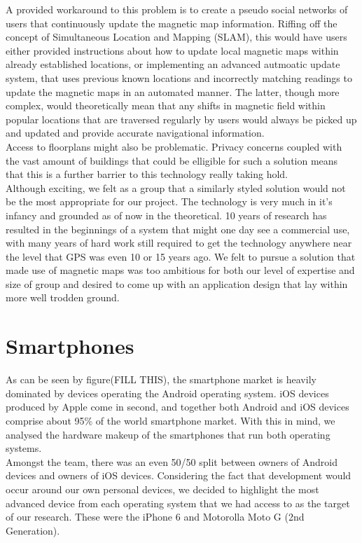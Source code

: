 \documentclass[main.tex]{subfiles}
\begin{document}
 A provided workaround to this problem is to create a pseudo social networks of users that continuously update the magnetic map information. Riffing off the concept of Simultaneous Location and Mapping (SLAM), this would have users either provided instructions about how to update local magnetic maps within already established locations, or implementing an advanced autmoatic update system, that uses previous known locations and incorrectly matching readings to update the magnetic maps in an automated manner. The latter, though more complex, would theoretically mean that any shifts in magnetic field within popular locations that are traversed regularly by users would always be picked up and updated and provide accurate navigational information.\\
 
 Access to floorplans might also be problematic. Privacy concerns coupled with the vast amount of buildings that could be elligible for such a solution means that this is a further barrier to this technology really taking hold.\\
 
 Although exciting, we felt as a group that a similarly styled solution would not be the most appropriate for our project. The technology is very much in it's infancy and grounded as of now in the theoretical. 10 years of research has resulted in the beginnings of a system that might one day see a commercial use, with many years of hard work still required to get the technology anywhere near the level that GPS was even 10 or 15 years ago. We felt to pursue a solution that made use of magnetic maps was too ambitious for both our level of expertise and size of group and desired to come up with an application design that lay within more well trodden ground.
 

\section{Smartphones}

As can be seen by figure(FILL THIS), the smartphone market is heavily dominated by devices operating the Android operating system. iOS devices produced by Apple come in second, and together both Android and iOS devices comprise about 95\% of the world smartphone market. With this in mind, we analysed the hardware makeup of the smartphones that run both operating systems. \\

Amongst the team, there was an even 50/50 split between owners of Android devices and owners of iOS devices. Considering the fact that development would occur around our own personal devices, we decided to highlight the most advanced device from each operating system that we had access to as the target of our research. These were the iPhone 6 and Motorolla Moto G (2nd Generation).
\end{document}
